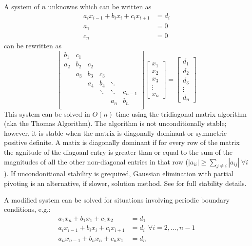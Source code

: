 A system of $n$ unknowns which can be written as
\begin{align}
a_i x_{i-1}+b_i x_i + c_i x_{i+1} &= d_i \\
a_1 &=0                                  \\
c_n &=0
\end{align}
can be rewritten as
\begin{equation}
\begin{bmatrix}
b_1 & c_1 &     &        &        &         \\
a_2 & b_2 & c_2 &        &        &         \\
    & a_3 & b_3 & c_3    &        &         \\
    &     & a_4 & b_4    & \ddots &         \\
    &     &     & \ddots & \ddots & c_{n-1} \\
    &     &     &        & a_n    & b_n     \\
\end{bmatrix}
\begin{bmatrix}
x_1 \\ x_2 \\ x_3 \\ \vdots \\ x_n
\end{bmatrix}
=
\begin{bmatrix}
d_1 \\ d_2 \\ d_3 \\ \vdots \\ d_n
\end{bmatrix}
\end{equation}
This system can be solved in $O(n)$ time using the tridiagonal matrix algorithm (aka the Thomas Algorithm). The algorithm is not unconditionally stable; however, it is stable when the matrix is diagonally dominant or symmetric positive definite. A matix is diagonally dominant if for every row of the matrix the agnitude of the diagoanl entry is greater than or equal to the sum of the magnitudes of all the other non-diagonal entries in that row ($|a_{ii}|\ge\sum_{j\ne i} |a_{ij}|~\forall i$). If uncondonitional stability is grequired, Gaussian elimination with partial pivoting is an alternative, if slower, solution method. See \citep[Theorem 9.12]{Higham2002} for full stability details.

A modified system can be solved for situations involving periodic boundary conditions, e.g.:
\begin{align}
a_1 x_n + b_1 x_1 + c_1 x_2 &= d_1 \\
a_i x_{i-1} + b_i x_i + c_i x_{i+1} &= d_i~~\forall i=2,\ldots,n-1 \\
a_n x_{n-1}+b_n x_n + c_n x_1 &= d_n
\end{align}

